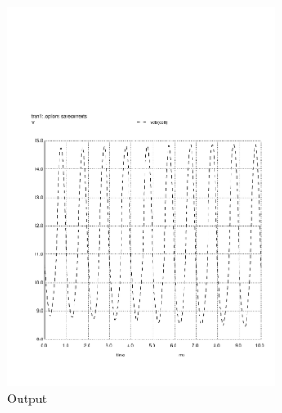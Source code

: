 %

%

%

\begin{figure}[H] 
\centering
\includegraphics[width = 8cm]{vo1.pdf} 
\caption{Output}
\label{vo1}
\end{figure}

